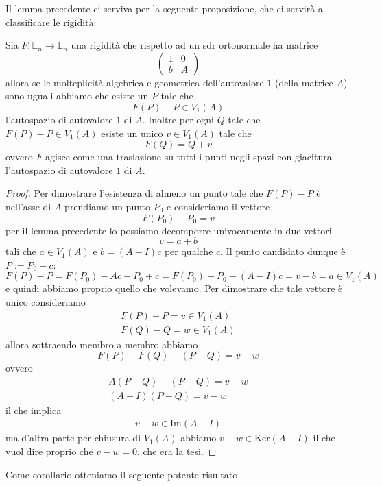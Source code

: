 \documentclass[11pt]{scrartcl}
\newcommand{\Immagine}[1]{\text{Im}\left(#1\right)}
\renewcommand{\ker}[1]{\text{Ker}\left(#1\right)}
\begin{document}
   	 Il lemma precedente ci serviva per la seguente proposizione, che ci servirà a classificare le rigidità:
   	 \begin{proposition}
   	 	Sia $F:\mathbb{E}_n\to\mathbb{E}_n$ una rigidità che rispetto ad un sdr ortonormale ha matrice
   	 	$$
   	 	\left(
   	 	\begin{array}{c|c}
   	 		1 & 0 \\
   	 		\hline 
   	 		b & A
   	 	\end{array}
   	 	\right)
   	 	$$
   	 	allora se le molteplicità algebrica e geometrica dell'autovalore $1$ (della matrice $A$) sono uguali abbiamo che esiste un $P$ tale che 
   	 	$$F(P)-P\in V_1(A)$$
   	 	l'autospazio di autovalore $1$ di $A$. Inoltre per ogni $Q$ tale che $F(P)-P\in V_1(A)$ esiste un unico $v\in V_1(A)$ tale che
   	 	$$F(Q)=Q+v$$
   	 	ovvero $F$ agisce come una traslazione su tutti i punti negli spazi con giacitura l'autospazio di autovalore $1$ di $A$.
   	 \end{proposition}
   	 \begin{proof}
   	 	Per dimostrare l'esistenza di almeno un punto tale che $F(P)-P$ è nell'asse di $A$ prendiamo un punto $P_0$ e consideriamo il vettore
   	 	$$F(P_0)-P_0=v$$
   	 	per il lemma precedente lo possiamo decomporre univocamente in due vettori 
   	 	$$v=a+b$$
   	 	tali che $a\in V_1(A)$ e $b=(A-I)c$ per qualche $c$. Il punto candidato dunque è
   	 	$P:=P_0-c$:
   	 	$$F(P)-P=F(P_0)-Ac-P_0+c=F(P_0)-P_0-(A-I)c=v-b=a\in V_1(A)$$
   	 	e quindi abbiamo proprio quello che volevamo. Per dimostrare che tale vettore è unico consideriamo 
   	 	\begin{gather*}
   	 		F(P)-P=v\in V_1(A) \\
   	 		F(Q)-Q=w\in V_1(A)
   	 	\end{gather*}
   	 	allora sottraendo membro a membro abbiamo
   	 	$$F(P)-F(Q)-(P-Q)=v-w$$
   	 	ovvero 
   	 	\begin{gather*}
   	 		A(P-Q)-(P-Q)=v-w \\
   	 		(A-I)(P-Q)=v-w
   	 	\end{gather*}
   	 	il che implica 
   	 	\begin{gather*}
   	 		v-w\in \Immagine{A-I}
   	 	\end{gather*}
   	 	ma d'altra parte per chiusura di $V_1(A)$ abbiamo $v-w\in \ker{A-I}$ il che vuol dire proprio che $v-w=0$, che era la tesi.
   	 \end{proof}
   	 Come corollario otteniamo il seguente potente risultato
\end{document}
